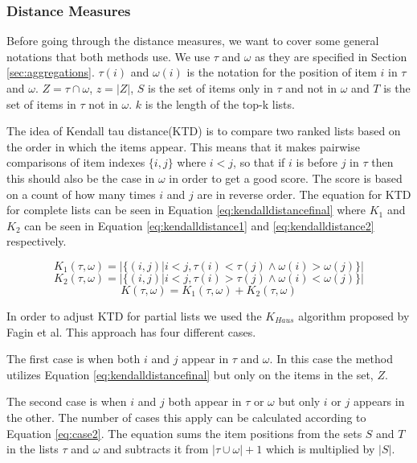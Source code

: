 \subsubsection{Distance Measures}\label{sec:distance}
Before going through the distance measures, we want to cover some general notations that both methods use. We use $\tau$ and $\omega$ as they are specified in Section \ref{sec:aggregations}. $\tau(i)$ and $\omega(i)$ is the notation for the position of item $i$ in $\tau$ and $\omega$. $Z = \tau \cap \omega$, $z=|Z|$, $S$ is the set of items only in $\tau$ and not in $\omega$ and $T$ is the set of items in $\tau$ not in $\omega$. $k$ is the length of the top-k lists.

The idea of Kendall tau distance(KTD) is to compare two ranked lists based on the order in which the items appear. This means that it makes pairwise comparisons of item indexes $\{i,j\}$ where $i < j$, so that if $i$ is before $j$ in $\tau$ then this should also be the case in $\omega$ in order to get a good score. The score is based on a count of how many times $i$ and $j$ are in reverse order. The equation for KTD for complete lists can be seen in Equation \ref{eq:kendalldistancefinal} where $K_1$ and $K_2$ can be seen in Equation \ref{eq:kendalldistance1} and \ref{eq:kendalldistance2} respectively.

\begin{equation}\label{eq:kendalldistance1}
K_1(\tau,\omega) = | \{(i,j) | i < j, \tau (i) < \tau (j) \land \omega (i) > \omega (j)\}|
\end{equation}
\begin{equation}\label{eq:kendalldistance2}
K_2(\tau,\omega) = | \{(i,j) | i < j, \tau (i) > \tau (j) \land \omega (i) < \omega (j) \} |
\end{equation}
\begin{equation}\label{eq:kendalldistancefinal}
K(\tau,\omega) = K_1(\tau,\omega) + K_2(\tau,\omega)
\end{equation}

In order to adjust KTD for partial lists we used the $K_{Haus}$ algorithm proposed by Fagin et al\cite{comparing:topk}. This approach has four different cases.

The first case is when both $i$ and $j$ appear in $\tau$ and $\omega$. In this case the method utilizes Equation \ref{eq:kendalldistancefinal} but only on the items in the set, $Z$.

The second case is when $i$ and $j$ both appear in $\tau$ or $\omega$ but only $i$ or $j$ appears in the other. The number of cases this apply can be calculated according to Equation \ref{eq:case2}. The equation sums the item positions from the sets $S$ and $T$ in the lists $\tau$ and $\omega$ and subtracts it from $|\tau \cup \omega| + 1$ which is multiplied by $|S|$.

